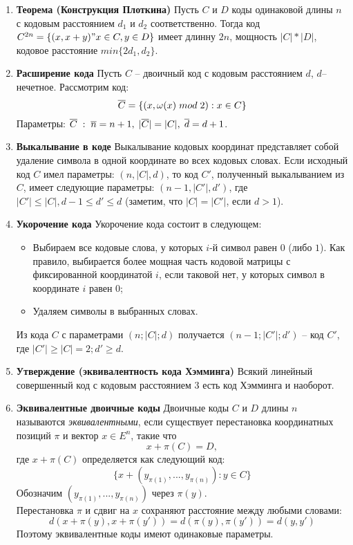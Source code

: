 \documentclass[a4paper, 12pt]{report}
\begin{document}
\begin{enumerate}
\item \textbf{Теорема (Конструкция Плоткина)}
Пусть $C$ и $D$ коды одинаковой длины $n$ с кодовым расстоянием $d_{1}$ и $d_{2}$ соответственно. Тогда код $C^{2n} = \lbrace(x, x+y)" x\in C, y\in D\rbrace$ имеет длинну $2n$, мощность $|C|*|D|$, кодовое расстояние $min\lbrace 2d_{1}, d_{2}\rbrace$.

\item \textbf{Расширение кода} Пусть $C$ – двоичный код с кодовым расстоянием $d$, $d$–нечетное. Рассмотрим код:
\[\overline{C} = \lbrace (x, \omega (x)\hspace{0.1cm} mod\hspace{0.1cm} 2):x\in C\rbrace\]
Параметры: $\overline{C}\hspace{0.1cm}:\hspace{0.1cm} \overline{n} = n + 1, \hspace{0.1cm} |\overline{C}| = |C|,\hspace{0.1cm} \overline{d} = d + 1$.

\item \textbf{Выкалывание в коде} Выкалывание кодовых координат представляет собой удаление символа в одной координате во всех кодовых словах. Если исходный код $C$ имел параметры: $(n, |C|, d)$, то код $C'$, полученный выкалыванием из $C$, имеет следующие параметры: $(n - 1, |C'|, d')$, где $|C'| \leq |C|, d - 1 \leq d' \leq d$ (заметим, что $|C| = |C'|$, если $d > 1$).

\item \textbf{Укорочение кода} Укорочение кода состоит в следующем:
\begin{itemize}
\item Выбираем все кодовые слова, у которых $i$-й символ равен $0$ (либо $1$). Как правило, выбирается более мощная часть кодовой матрицы с фиксированной координатой $i$, если таковой нет, у которых символ в координате $i$ равен $0$;
\item Удаляем символы в выбранных словах.
\end{itemize}

Из кода $C$ с параметрами $(n; |C|; d)$ получается
$(n - 1; |C'|; d')$ – код $C'$, где $|C'| \geq |C|=2; d' \geq d$.

\item \textbf{Утверждение (эквивалентность кода Хэмминга)} Всякий линейный совершенный код с кодовым расстоянием $3$ есть код Хэмминга и наоборот.

\item \textbf{Эквивалентные двоичные коды} Двоичные коды $C$ и $D$ длины $n$ называются \textit{эквивалентными}, если существует перестановка координатных позиций $\pi$ и вектор $x \in E^{n}$, такие что
\[x + \pi(C) = D,\]
где $x + \pi(C)$ определяется как следующий код:
\[\lbrace x + (y_{\pi(1)}, ... , y_{\pi(n)}) : y\in C\rbrace\]
Обозначим $(y_{\pi(1)}, ... , y_{\pi(n)})$ через $\pi(y)$.\\
Перестановка $\pi$ и сдвиг на $x$ сохраняют расстояние между любыми словами:
\[d(x + \pi(y), x + \pi(y')) = d(\pi(y), \pi(y')) = d(y,y')\]
Поэтому эквивалентные коды имеют одинаковые параметры.


\end{enumerate}
\end{document}
